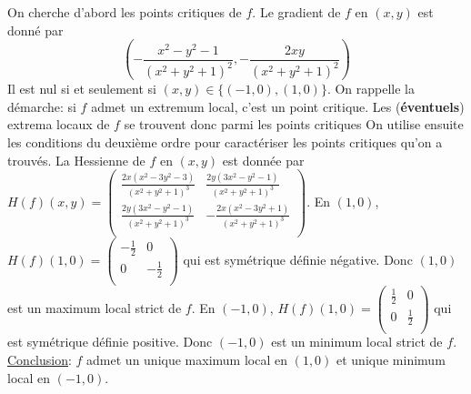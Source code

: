 \documentclass{report}
\begin{document}
\subsection{} \noindent{}\\ 
\\ 
\\
\noindent On cherche d'abord les points critiques de $f$. Le gradient de $f$ en $(x,y)$ est donné par $$\left(-\frac{x^2-y^2-1}{\left(x^2+y^2+1\right)^2},-\frac{2 x y}{\left(x^2+y^2+1\right)^2}\right)$$ Il est nul si et seulement si $(x,y)\in \{(-1,0),(1,0)\}$.\newline 
\newline
On rappelle la démarche: si $f$ admet un extremum local, c'est un point critique. Les (\textbf{éventuels}) extrema locaux de $f$ se trouvent donc parmi les points critiques On utilise ensuite les conditions du deuxième ordre pour caractériser les points critiques qu'on a trouvés. \newline 
\newline
La Hessienne de $f$ en $(x,y)$ est donnée par $H(f)(x,y)= \left(
\begin{array}{cc}
 \frac{2 x \left(x^2-3 y^2-3\right)}{\left(x^2+y^2+1\right)^3} & \frac{2 y \left(3 x^2-y^2-1\right)}{\left(x^2+y^2+1\right)^3} \\
 \frac{2 y \left(3 x^2-y^2-1\right)}{\left(x^2+y^2+1\right)^3} & -\frac{2 x \left(x^2-3 y^2+1\right)}{\left(x^2+y^2+1\right)^3} \\
\end{array}
\right)$.\newline
En $(1,0)$, $H(f)(1,0)=\left(
\begin{array}{cc}
 -\frac{1}{2} & 0 \\
 0 & -\frac{1}{2} \\
\end{array}
\right)$ qui est symétrique définie négative. Donc $(1,0)$ est un maximum local strict de $f$.\newline
En $(-1,0)$, $H(f)(1,0)=\left(
\begin{array}{cc}
 \frac{1}{2} & 0 \\
 0 & \frac{1}{2} \\
\end{array}
\right)$ qui est symétrique définie positive. Donc $(-1,0)$ est un minimum local strict de $f$.\newline
\newline
\underline{Conclusion}: $f$ admet un unique maximum local en $(1,0)$ et unique minimum local en $(-1,0)$.
\end{document}
